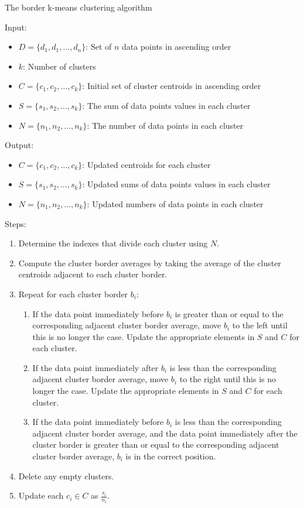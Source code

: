 \documentclass[conference,compsoc]{IEEEtran}
\begin{document}
\begin{algorithm}\label{alg-3}
    \caption{The border k-means clustering algorithm}
    Input:
        \begin{itemize}
            \item $D = \{d_1, d_1, \dots, d_n\}$: Set of $n$ data points in ascending order
            \item $k$: Number of clusters
            \item $C = \{c_1, c_2, \dots, c_k\}$: Initial set of cluster centroids in ascending order
            \item $S = \{s_1, s_2, \dots, s_k\}$: The sum of data points values in each cluster
            \item $N = \{n_1, n_2, \dots, n_k\}$: The number of data points in each cluster
        \end{itemize}
    Output:
        \begin{itemize}
            \item $C = \{c_1, c_2, \dots, c_k\}$: Updated centroids for each cluster
            \item $S = \{s_1, s_2, \dots, s_k\}$: Updated sums of data points values in each cluster
            \item $N = \{n_1, n_2, \dots, n_k\}$: Updated numbers of data points in each cluster
        \end{itemize}
    Steps:
        \begin{enumerate}
            \item Determine the indexes that divide each cluster using $N$.
            \item Compute the cluster border averages by taking the average of the cluster centroids adjacent to each cluster border.
            \item Repeat for each cluster border $b_i$:
            \begin{enumerate}
                \item If the data point immediately before $b_i$ is greater than or equal to the corresponding adjacent cluster border average, move $b_i$ to the left until this is no longer the case. Update the appropriate elements in $S$ and $C$ for each cluster.
                \item If the data point immediately after $b_i$ is less than the corresponding adjacent cluster border average, move $b_i$ to the right until this is no longer the case. Update the appropriate elements in $S$ and $C$ for each cluster.
                \item If the data point immediately before $b_i$ is less than the corresponding adjacent cluster border average, and the data point immediately after the cluster border is greater than or equal to the corresponding adjacent cluster border average, $b_i$ is in the correct position.
            \end{enumerate}
            \item Delete any empty clusters.
            \item Update each $c_i \in C$ as $\frac{s_i}{n_i}$.
        \end{enumerate}
\end{algorithm}
\end{document}
